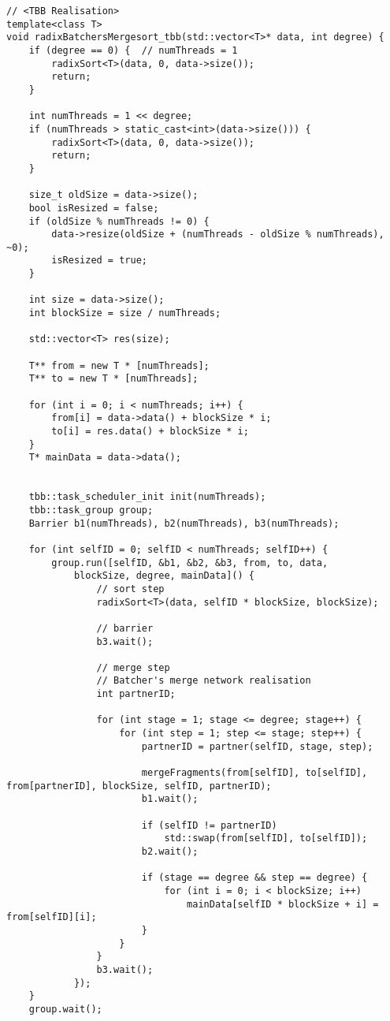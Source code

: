 \documentclass{report}
\begin{document}
\begin{lstlisting}
// <TBB Realisation>
template<class T>
void radixBatchersMergesort_tbb(std::vector<T>* data, int degree) {
    if (degree == 0) {  // numThreads = 1
        radixSort<T>(data, 0, data->size());
        return;
    }

    int numThreads = 1 << degree;
    if (numThreads > static_cast<int>(data->size())) {
        radixSort<T>(data, 0, data->size());
        return;
    }

    size_t oldSize = data->size();
    bool isResized = false;
    if (oldSize % numThreads != 0) {
        data->resize(oldSize + (numThreads - oldSize % numThreads), ~0);
        isResized = true;
    }

    int size = data->size();
    int blockSize = size / numThreads;

    std::vector<T> res(size);

    T** from = new T * [numThreads];
    T** to = new T * [numThreads];

    for (int i = 0; i < numThreads; i++) {
        from[i] = data->data() + blockSize * i;
        to[i] = res.data() + blockSize * i;
    }
    T* mainData = data->data();


    tbb::task_scheduler_init init(numThreads);
    tbb::task_group group;
    Barrier b1(numThreads), b2(numThreads), b3(numThreads);

    for (int selfID = 0; selfID < numThreads; selfID++) {
        group.run([selfID, &b1, &b2, &b3, from, to, data,
            blockSize, degree, mainData]() {
                // sort step
                radixSort<T>(data, selfID * blockSize, blockSize);

                // barrier
                b3.wait();

                // merge step
                // Batcher's merge network realisation
                int partnerID;

                for (int stage = 1; stage <= degree; stage++) {
                    for (int step = 1; step <= stage; step++) {
                        partnerID = partner(selfID, stage, step);

                        mergeFragments(from[selfID], to[selfID], from[partnerID], blockSize, selfID, partnerID);
                        b1.wait();

                        if (selfID != partnerID)
                            std::swap(from[selfID], to[selfID]);
                        b2.wait();

                        if (stage == degree && step == degree) {
                            for (int i = 0; i < blockSize; i++)
                                mainData[selfID * blockSize + i] = from[selfID][i];
                        }
                    }
                }
                b3.wait();
            });
    }
    group.wait();


\end{lstlisting}
\end{document}
